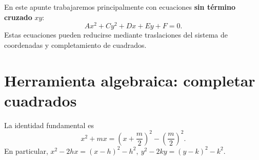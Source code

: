 \documentclass[11pt]{article}
\begin{document}
En este apunte trabajaremos principalmente con ecuaciones \textbf{sin término cruzado} $xy$:
\[
Ax^2+Cy^2+Dx+Ey+F=0.
\]
Estas ecuaciones pueden reducirse mediante traslaciones del sistema de coordenadas y completamiento de cuadrados.

\section*{Herramienta algebraica: completar cuadrados}

La identidad fundamental es
\[
x^2+mx
=\left(x+\frac{m}{2}\right)^2-\left(\frac{m}{2}\right)^2.
\]
En particular, $x^2-2hx=(x-h)^2-h^2,\ 
y^2-2ky=(y-k)^2-k^2.$ 
\end{document}
